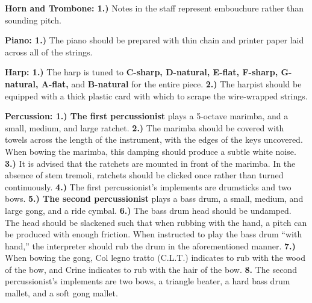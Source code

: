 \documentclass[11pt]{article}
\begin{document}
\begingroup
\begin{center}
\textbf{Horn and Trombone: 1.)} Notes in the staff represent embouchure rather than sounding pitch. \\
\rightskip\leftskip
\end{center}
\endgroup

\begingroup
\begin{center}
\textbf{Piano: 1.)} The piano should be prepared with thin chain and printer paper laid across all of the strings. \\
\rightskip\leftskip
\end{center}
\endgroup

\begingroup
\begin{center}
\textbf{Harp: 1.)} The harp is tuned to \textbf{C-sharp, D-natural, E-flat, F-sharp, G-natural, A-flat,} and \textbf{B-natural} for the entire piece. \textbf{2.)} The harpist should be equipped with a thick plastic card with which to scrape the wire-wrapped strings. \\
\rightskip\leftskip
\end{center}
\endgroup

\begingroup
\begin{center}
\textbf{Percussion: 1.) The first percussionist} plays a 5-octave marimba, and a small, medium, and large ratchet. \textbf{2.)} The marimba should be covered with towels across the length of the instrument, with the edges of the keys uncovered. When bowing the marimba, this damping should produce a subtle white noise. \textbf{3.)}  It is advised that the ratchets are mounted in front of the marimba. In the absence of stem tremoli, ratchets should be clicked once rather than turned continuously. \textbf{4.)} The first percussionist's implements are drumsticks and two bows. \textbf{5.) The second percussionist} plays a bass drum, a small, medium, and large gong, and a ride cymbal. \textbf{6.)} The bass drum head should be undamped. The head should be slackened such that when rubbing with the hand, a pitch can be produced with enough friction. When instructed to play the bass drum ``with hand,'' the interpreter should rub the drum in the aforementioned manner. \textbf{7.)} When bowing the gong, Col legno tratto (C.L.T.) indicates to rub with the wood of the bow, and Crine indicates to rub with the hair of the bow. \textbf{8.} The second percussionist's implements are two bows, a triangle beater, a hard bass drum mallet, and a soft gong mallet. \\
\rightskip\leftskip
\end{center}
\endgroup
\end{document}
